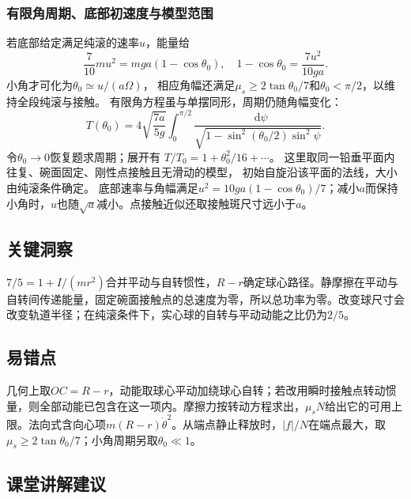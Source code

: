 \documentclass[UTF8,fontset=fandol,a4paper,11pt]{ctexart}
\newcommand{\dd}{\mathop{}\!\mathrm{d}}
\begin{document}
\subsubsection*{有限角周期、底部初速度与模型范围}
若底部给定满足纯滚的速率$u$，能量给
\[
\frac7{10}mu^2=mga(1-\cos\theta_0),
\quad 1-\cos\theta_0=\frac{7u^2}{10ga}.
\]
小角才可化为$\theta_0\simeq u/(a\Omega)$，
相应角幅还满足$\mu_s\ge2\tan\theta_0/7$和$\theta_0<\pi/2$，以维持全段纯滚与接触。
有限角方程虽与单摆同形，周期仍随角幅变化：
\[
T(\theta_0)=4\sqrt{\frac{7a}{5g}}
\int_0^{\pi/2}\frac{\dd\psi}{\sqrt{1-\sin^2(\theta_0/2)\sin^2\psi}}.
\]
令$\theta_0\to0$恢复题求周期；展开有
$T/T_0=1+\theta_0^2/16+\cdots$。
这里取同一铅垂平面内往复、碗面固定、刚性点接触且无滑动的模型，
初始自旋沿该平面的法线，大小由纯滚条件确定。
底部速率与角幅满足$u^2=10ga(1-\cos\theta_0)/7$；减小$a$而保持小角时，$u$也随$\sqrt a$减小。点接触近似还取接触斑尺寸远小于$a$。




\subsection*{关键洞察}

$7/5=1+I/(mr^2)$合并平动与自转惯性，$R-r$确定球心路径。静摩擦在平动与自转间传递能量，固定碗面接触点的总速度为零，所以总功率为零。改变球尺寸会改变轨道半径；在纯滚条件下，实心球的自转与平动动能之比仍为$2/5$。




\subsection*{易错点}

几何上取$OC=R-r$，动能取球心平动加绕球心自转；若改用瞬时接触点转动惯量，则全部动能已包含在这一项内。摩擦力按转动方程求出，$\mu_sN$给出它的可用上限。法向式含向心项$m(R-r)\dot\theta^2$。从端点静止释放时，$|f|/N$在端点最大，取$\mu_s\ge2\tan\theta_0/7$；小角周期另取$\theta_0\ll1$。




\subsection*{课堂讲解建议}
\end{document}
